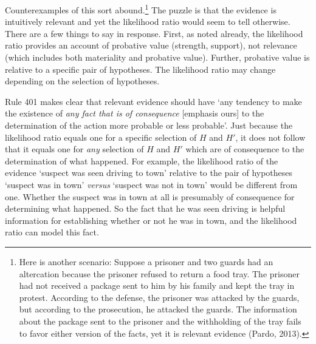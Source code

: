 \documentclass[
  letterpaper,
  DIV=11,
  numbers=noendperiod]{scrartcl}
\begin{document}
\noindent  Counterexamples of this sort abound.\footnote{Here is another
  scenario: Suppose a prisoner and two guards had an altercation because
  the prisoner refused to return a food tray. The prisoner had not
  received a package sent to him by his family and kept the tray in
  protest. According to the defense, the prisoner was attacked by the
  guards, but according to the prosecution, he attacked the guards. The
  information about the package sent to the prisoner and the withholding
  of the tray fails to favor either version of the facts, yet it is
  relevant evidence (Pardo, 2013).} The puzzle is that the evidence is
intuitively relevant and yet the likelihood ratio would seem to tell
otherwise. There are a few things to say in response. First, as noted
already, the likelihood ratio provides an account of probative value
(strength, support), not relevance (which includes both materiality and
probative value). Further, probative value is relative to a specific
pair of hypotheses. The likelihood ratio may change depending on the
selection of hypotheses.

Rule 401 makes clear that relevant evidence should have `any tendency to
make the existence of \emph{any fact that is of consequence} {[}emphasis
ours{]} to the determination of the action more probable or less
probable'. Just because the likelihood ratio equals one for a specific
selection of \(H\) and \(H'\), it does not follow that it equals one for
\textit{any} selection of \(H\) and \(H'\) which are of consequence to
the determination of what happened. For example, the likelihood ratio of
the evidence `suspect was seen driving to town' relative to the pair of
hypotheses `suspect was in town' \textit{versus} `suspect was not in
town' would be different from one. Whether the suspect was in town at
all is presumably of consequence for determining what happened. So the
fact that he was seen driving is helpful information for establishing
whether or not he was in town, and the likelihood ratio can model this
fact.
\end{document}
